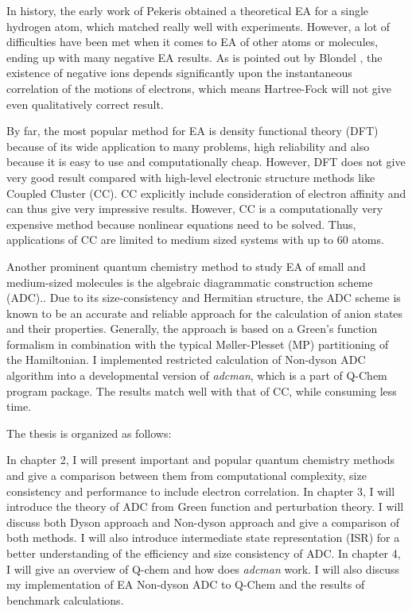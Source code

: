 In history, the early work of Pekeris obtained a theoretical EA for a single hydrogen atom, which matched really well with experiments. \cite{pekeris}
However, a lot of difficulties have been met when it comes to EA of other atoms or molecules, ending up with many negative EA results.
As is pointed out by Blondel \cite{blondel}, the existence of negative ions depends significantly upon the instantaneous correlation of the motions of electrons, which means Hartree-Fock will not give even qualitatively correct result.

By far, the most popular method for EA is density functional theory (DFT) because of its wide application to many problems, high reliability and also because it is easy to use and computationally cheap.
However, DFT does not give very good result compared with high-level electronic structure methods like Coupled Cluster (CC).
CC explicitly include consideration of electron affinity and can thus give very impressive results.
However, CC is a computationally very expensive method because nonlinear equations need to be solved.
Thus, applications of CC are limited to medium sized systems with up to 60 atoms.

Another prominent quantum chemistry method to study EA of small and medium-sized molecules is the algebraic diagrammatic construction scheme (ADC).. \cite{implementation, ADCpp}
Due to its size-consistency and Hermitian structure, the ADC scheme is known to be an accurate and reliable approach for the calculation of anion states and their properties.
Generally, the approach is based on a Green’s function formalism in combination with the typical M{\o}ller-Plesset (MP) partitioning of the Hamiltonian.
I implemented restricted calculation of Non-dyson ADC algorithm into a developmental version of \emph{adcman}, which is a part of Q-Chem program package.
The results match well with that of CC, while consuming less time.

The thesis is organized as follows:

In chapter 2, I will present important and popular quantum chemistry methods and give a comparison between them from computational complexity, size consistency and performance to include electron correlation.
In chapter 3, I will introduce the theory of ADC from Green function and perturbation theory.
I will discuss both Dyson approach and Non-dyson approach and give a comparison of both methods.
I will also introduce intermediate state representation (ISR) for a better understanding of the efficiency and size consistency of ADC.
In chapter 4, I will give an overview of Q-chem and how does \emph{adcman} work.
I will also discuss my implementation of EA Non-dyson ADC to Q-Chem and the results of benchmark calculations.


